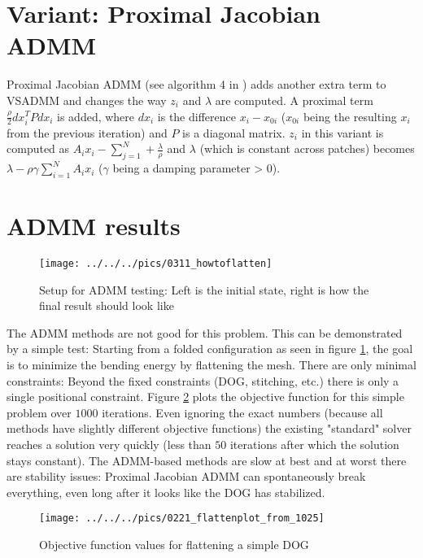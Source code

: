 \documentclass[a4paper,twoside,12pt,nochapterprefix]{scrbook}
\begin{document}
\section{Variant: Proximal Jacobian ADMM}
Proximal Jacobian ADMM (see algorithm 4 in \cite{Deng2017ParallelMA}) adds another extra term to VSADMM and changes the way $z_i$ and $\lambda$ are computed. A proximal term $\frac{\rho}{2} dx_i^T P dx_i$ is added, where $dx_i$ is the difference $x_i - x_{0i}$ ($x_{0i}$ being the resulting $x_i$ from the previous iteration) and $P$ is a diagonal matrix. $z_i$ in this variant is computed as $A_i x_i - \sum_{j=1}^N + \frac{\lambda}{\rho}$ and $\lambda$ (which is constant across patches) becomes $\lambda - \rho \gamma \sum_{i=1}^N A_i x_i$ ($\gamma$ being a damping parameter > 0).%
\section{ADMM results}
\begin{figure}
    \centering
    \texttt{[image: ../../../pics/0311\_howtoflatten]}
    \caption{Setup for ADMM testing: Left is the initial state, right is how the final result should look like}
    \label{fig:admm_setup}
\end{figure}
The ADMM methods are not good for this problem. This can be demonstrated by a simple test: Starting from a folded configuration as seen in figure \ref{fig:admm_setup}, the goal is to minimize the bending energy by flattening the mesh. There are only minimal constraints: Beyond the fixed constraints (DOG, stitching, etc.) there is only a single positional constraint.\newline
Figure \ref{fig:admm_results} plots the objective function for this simple problem over $1000$ iterations. Even ignoring the exact numbers (because all methods have slightly different objective functions) the existing "standard" solver reaches a solution very quickly (less than $50$ iterations after which the solution stays constant). The ADMM-based methods are slow at best and at worst there are stability issues: Proximal Jacobian ADMM can spontaneously break everything, even long after it looks like the DOG has stabilized.\newline
\begin{figure}
    \centering
    \texttt{[image: ../../../pics/0221\_flattenplot\_from\_1025]}
    \caption{Objective function values for flattening a simple DOG}
    \label{fig:admm_results}
\end{figure}
\end{document}
